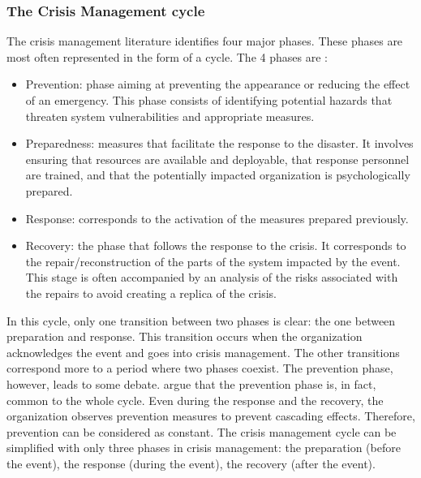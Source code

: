 \subsubsection{The Crisis Management cycle}
The crisis management literature identifies four major phases.
These phases are most often represented in the form of a cycle.
The 4 phases are :

\begin{itemize}
    \item Prevention: phase aiming at preventing the appearance or reducing the effect of an emergency.
          This phase consists of identifying potential hazards that threaten system vulnerabilities and appropriate measures.
    \item Preparedness: measures that facilitate the response to the disaster. It involves ensuring that resources are available and deployable, that response personnel are trained, and that the potentially impacted organization is psychologically prepared.
    \item Response: corresponds to the activation of the measures prepared previously.
    \item Recovery: the phase that follows the response to the crisis. It corresponds to the repair/reconstruction of the parts of the system impacted by the event.
          This stage is often accompanied by an analysis of the risks associated with the repairs to avoid creating a replica of the crisis.
\end{itemize}

In this cycle, only one transition between two phases is clear: the one between preparation and response.
This transition occurs when the organization acknowledges the event and goes into crisis management.
The other transitions correspond more to a period where two phases coexist.
The prevention phase, however, leads to some debate.
\textcite{benabenCollaborativeSystemsCrisis2014} argue that the prevention phase is, in fact, common to the whole cycle.
Even during the response and the recovery, the organization observes prevention measures to prevent cascading effects.
Therefore, prevention can be considered as constant.
The crisis management cycle can be simplified with only three phases in crisis management: the preparation (before the event), the response (during the event), the recovery (after the event).

